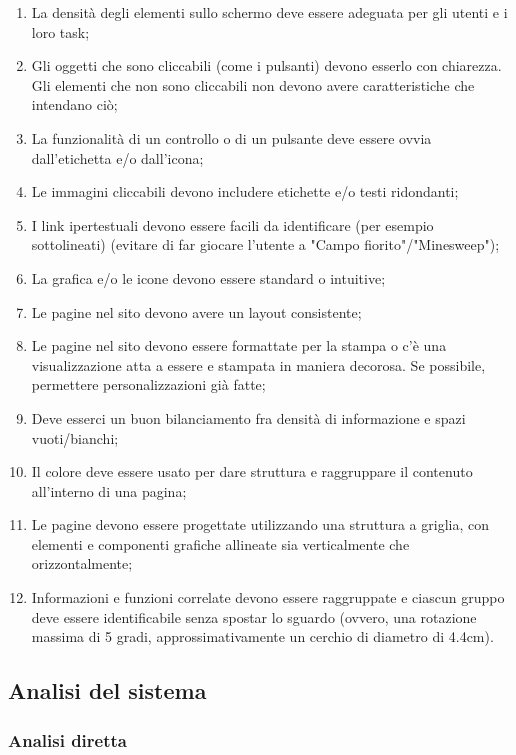 \begin{enumerate}
    \item La densità degli elementi sullo schermo deve essere adeguata per gli utenti e i loro task;\label{lg:31}
    \item Gli oggetti che sono cliccabili (come i pulsanti) devono esserlo con chiarezza. Gli elementi che non sono cliccabili non devono avere caratteristiche che intendano ciò;\label{lg:32}
    \item La funzionalità di un controllo o di un pulsante deve essere ovvia dall'etichetta e/o dall'icona;\label{lg:33}
    \item Le immagini  cliccabili devono includere etichette e/o testi ridondanti;\label{lg:34}
    \item I link ipertestuali devono essere facili da identificare (per esempio sottolineati) (evitare di far giocare l'utente a "Campo fiorito"/"Minesweep");\label{lg:35}
    \item La grafica e/o le icone devono essere standard o intuitive;\label{lg:36}
    \item Le pagine nel sito devono avere un layout consistente;\label{lg:37}
    \item Le pagine nel sito devono essere formattate per la stampa o c'è una visualizzazione atta a essere e stampata in maniera decorosa. Se possibile, permettere personalizzazioni già fatte;\label{lg:38}
    \item Deve esserci un buon bilanciamento fra densità di informazione e spazi vuoti/bianchi;\label{lg:39}
    \item Il colore deve essere usato per dare struttura e raggruppare il contenuto all'interno di una pagina;\label{lg:40}
    \item Le pagine devono essere progettate utilizzando una struttura a griglia, con elementi e componenti grafiche allineate sia verticalmente che orizzontalmente;\label{lg:41}
    \item Informazioni e funzioni correlate devono essere raggruppate e ciascun gruppo deve essere identificabile senza spostar lo sguardo (ovvero, una rotazione massima di 5 gradi, approssimativamente un cerchio di diametro di 4.4cm).\label{lg:42}
\end{enumerate}

\subsection{Analisi del sistema}

\subsubsection{Analisi diretta}

